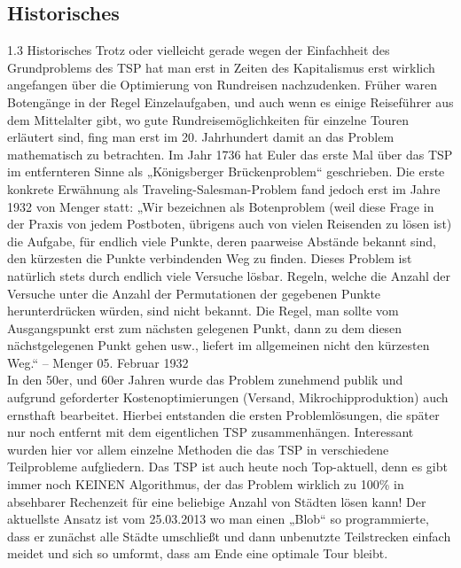\documentclass[a4paper]{article}
\begin{document}
		\subsection{Historisches}
		1.3 Historisches
Trotz oder vielleicht gerade wegen der Einfachheit des Grundproblems des TSP hat man erst in Zeiten des Kapitalismus erst wirklich angefangen über die Optimierung von Rundreisen nachzudenken. Früher waren Botengänge in der Regel Einzelaufgaben, und auch wenn es einige Reiseführer aus dem Mittelalter gibt, wo gute Rundreisemöglichkeiten für einzelne Touren erläutert sind, fing man erst im 20. Jahrhundert damit an das Problem mathematisch zu betrachten.
Im Jahr 1736 hat Euler das erste Mal über das TSP im entfernteren Sinne als „Königsberger Brückenproblem“ geschrieben.
Die erste konkrete Erwähnung als Traveling-Salesman-Problem fand jedoch erst im Jahre 1932 von Menger statt:
„Wir bezeichnen als Botenproblem (weil diese Frage in der Praxis von jedem Postboten, übrigens auch von vielen Reisenden zu lösen ist) die Aufgabe, für endlich viele Punkte, deren paarweise Abstände bekannt sind, den kürzesten die Punkte verbindenden Weg zu finden. Dieses Problem ist natürlich stets durch endlich viele Versuche lösbar. Regeln, welche die Anzahl der Versuche unter die Anzahl der Permutationen der gegebenen Punkte herunterdrücken würden, sind nicht bekannt. Die Regel, man sollte vom Ausgangspunkt erst zum nächsten gelegenen Punkt, dann zu dem diesen nächstgelegenen Punkt gehen usw., liefert im allgemeinen nicht den kürzesten Weg.“ – Menger 05. Februar 1932
\\

In den 50er, und 60er Jahren wurde das Problem zunehmend publik und aufgrund geforderter Kostenoptimierungen (Versand, Mikrochipproduktion) auch ernsthaft bearbeitet. Hierbei entstanden die ersten Problemlösungen, die später nur noch entfernt mit dem eigentlichen TSP zusammenhängen. Interessant wurden hier vor allem einzelne Methoden die das TSP in verschiedene Teilprobleme aufgliedern. 
Das TSP ist auch heute noch Top-aktuell, denn es gibt immer noch KEINEN Algorithmus, der das Problem wirklich zu 100\% in absehbarer Rechenzeit für eine beliebige Anzahl von Städten lösen kann!
Der aktuellste Ansatz ist vom 25.03.2013 wo man einen „Blob“ so programmierte, dass er zunächst alle Städte umschließt und dann unbenutzte Teilstrecken einfach meidet und sich so umformt, dass am Ende eine optimale Tour bleibt.
\\
\end{document}
